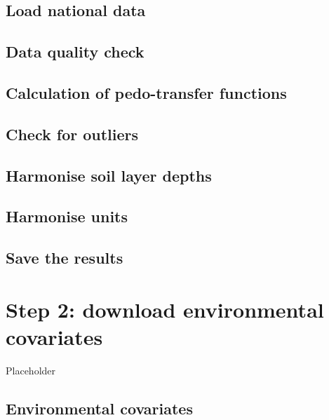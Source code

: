 \documentclass[
  10pt,
  b5paper,
  oneside]{book}
\begin{document}
\hypertarget{load-national-data}{%
\section{Load national data}\label{load-national-data}}

\hypertarget{data-quality-check}{%
\section{Data quality check}\label{data-quality-check}}

\hypertarget{calculation-of-pedo-transfer-functions}{%
\section{Calculation of pedo-transfer functions}\label{calculation-of-pedo-transfer-functions}}

\hypertarget{check-for-outliers}{%
\section{Check for outliers}\label{check-for-outliers}}

\hypertarget{harmonise-soil-layer-depths}{%
\section{Harmonise soil layer depths}\label{harmonise-soil-layer-depths}}

\hypertarget{harmonise-units}{%
\section{Harmonise units}\label{harmonise-units}}

\hypertarget{save-the-results}{%
\section{Save the results}\label{save-the-results}}

\hypertarget{step-2-download-environmental-covariates}{%
\chapter{Step 2: download environmental covariates}\label{step-2-download-environmental-covariates}}

Placeholder

\hypertarget{environmental-covariates-1}{%
\section{Environmental covariates}\label{environmental-covariates-1}}
\end{document}
